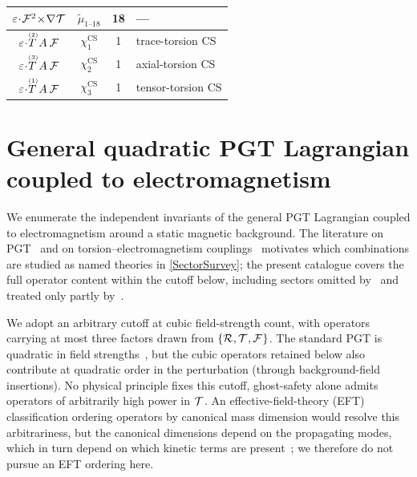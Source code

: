 \begin{table}[t]
\begin{tabular}{@{}cccl@{}}
    $\varepsilon\!\cdot\!\FieldF{^2}\!\times\!\rcD{}\MAGT{}$    & $\tilde\mu_{1\text{--}18}$    & 18          & --- \\
    \midrule
    $\varepsilon\!\cdot\!\T[2]{}\,\FieldA{}\,\FieldF{}$     & $\chi^\text{CS}_1$ & 1 & trace-torsion CS~\cite{hehl2000electromagnetic,itin2004maxwell} \\
    $\varepsilon\!\cdot\!\T[3]{}\,\FieldA{}\,\FieldF{}$     & $\chi^\text{CS}_2$ & 1 & axial-torsion CS~\cite{obukhov2024electrodynamics} \\
    $\varepsilon\!\cdot\!\T[1]{}\,\FieldA{}\,\FieldF{}$     & $\chi^\text{CS}_3$ & 1 & tensor-torsion CS \\
    \bottomrule
  \end{tabular}
\end{table}

\section{General quadratic PGT Lagrangian coupled to electromagnetism}
\label{PGTEnumeration}

We enumerate the independent invariants of the general PGT
Lagrangian coupled to electromagnetism around a static magnetic
background.
The literature on PGT~\cite{kibble1961lorentz,hehl1976spin,hehl1995metric,blagojevic2002gravitation,blagojevic2003lectures,sezgin1980ghostfree,hayashi1979new,lin2019pgt,blagojevic2018hamiltonian,karananas2014parity,aoki2020nonlinear,barker2024poincare,barker2021hamiltonian,bahamonde2025cubic}
and on torsion--electromagnetism
couplings~\cite{hehl2000electromagnetic,itin2004maxwell,rubilar2003torsion,shapiro2002torsion,obukhov2024electrodynamics,bahamonde2025torsion}
motivates which combinations are studied as named theories in
\cref{SectorSurvey}; the present catalogue covers the full
operator content within the cutoff below, including sectors
omitted by~\cite{barker2024poincare} and treated only partly
by~\cite{karananas2014parity,blagojevic2018hamiltonian}.

We adopt an arbitrary cutoff at cubic field-strength count, with
operators carrying at most three factors drawn from
$\{\MAGF{}, \MAGT{}, \FieldF{}\}$. The standard PGT is quadratic in
field strengths~\cite{blagojevic2018hamiltonian,shapiro2002torsion},
but the cubic operators retained below also contribute at quadratic
order in the perturbation (through
background-field insertions). No physical principle fixes this cutoff, \eg ghost-safety alone
admits operators of arbitrarily high power in $\MAGT{}$. An
effective-field-theory (EFT) classification ordering operators by
canonical mass dimension would resolve this arbitrariness, but
the canonical dimensions depend on the propagating modes, which
in turn depend on which kinetic terms are
present~\cite{aoki2020nonlinear}; we therefore do not pursue an
EFT ordering here.

